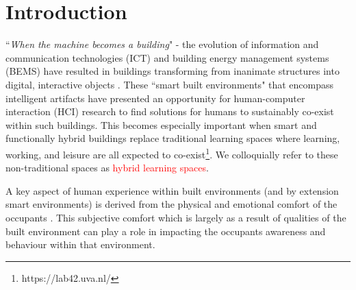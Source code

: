 \documentclass[manuscript, anonymous, review]{acmart}
\begin{document}



 
\maketitle

\section{Introduction}
``\textit{When the machine becomes a building}" - the evolution of information and communication technologies (ICT) and building energy management systems (BEMS) have resulted in buildings transforming from inanimate structures into digital, interactive objects \cite{nembrini2017human}. These ``smart built environments" that encompass intelligent artifacts have presented an opportunity for human-computer interaction (HCI) research to find solutions for humans to sustainably co-exist within such buildings. This becomes especially important when smart and functionally hybrid buildings replace traditional learning spaces where learning, working, and leisure are all expected to co-exist\footnote{https://lab42.uva.nl/}. We colloquially refer to these non-traditional spaces as \textcolor{red}{hybrid learning spaces}. 

A key aspect of human experience within built environments (and by extension smart environments) is derived from the physical and emotional comfort of the occupants \cite{alavi2017comfort}. This subjective comfort which is largely as a result of qualities of the built environment can play a role in impacting the occupants awareness and behaviour within that environment.  
\end{document}
